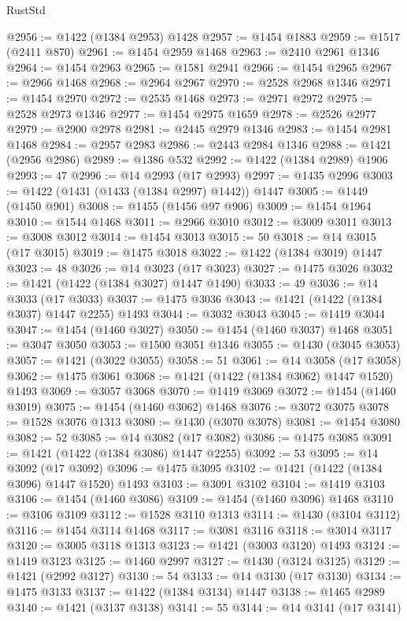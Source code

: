 \begin{lexlean}{RustStd}
\begin{coremodule}
@2956 := @1422 (@1384 @2953) @1428
@2957 := @1454 @1883
@2959 := @1517 (@2411 @870)
@2961 := @1454 @2959 @1468
@2963 := @2410 @2961 @1346
@2964 := @1454 @2963
@2965 := @1581 @2941
@2966 := @1454 @2965
@2967 := @2966 @1468
@2968 := @2964 @2967
@2970 := @2528 @2968 @1346
@2971 := @1454 @2970
@2972 := @2535 @1468
@2973 := @2971 @2972
@2975 := @2528 @2973 @1346
@2977 := @1454 @2975 @1659
@2978 := @2526 @2977
@2979 := @2900 @2978
@2981 := @2445 @2979 @1346
@2983 := @1454 @2981 @1468
@2984 := @2957 @2983
@2986 := @2443 @2984 @1346
@2988 := @1421 (@2956 @2986)
@2989 := @1386 @532
@2992 := @1422 (@1384 @2989) @1906
@2993 := 47
@2996 := @14 @2993 (@17 @2993)
@2997 := @1435 @2996
@3003 := @1422 (@1431 (@1433 (@1384 @2997) @1442)) @1447
@3005 := @1449 (@1450 @901)
@3008 := @1455 (@1456 @97 @906)
@3009 := @1454 @1964
@3010 := @1544 @1468
@3011 := @2966 @3010
@3012 := @3009 @3011
@3013 := @3008 @3012
@3014 := @1454 @3013
@3015 := 50
@3018 := @14 @3015 (@17 @3015)
@3019 := @1475 @3018
@3022 := @1422 (@1384 @3019) @1447
@3023 := 48
@3026 := @14 @3023 (@17 @3023)
@3027 := @1475 @3026
@3032 := @1421 (@1422 (@1384 @3027) @1447 @1490)
@3033 := 49
@3036 := @14 @3033 (@17 @3033)
@3037 := @1475 @3036
@3043 := @1421 (@1422 (@1384 @3037) @1447 @2255) @1493
@3044 := @3032 @3043
@3045 := @1419 @3044
@3047 := @1454 (@1460 @3027)
@3050 := @1454 (@1460 @3037) @1468
@3051 := @3047 @3050
@3053 := @1500 @3051 @1346
@3055 := @1430 (@3045 @3053)
@3057 := @1421 (@3022 @3055)
@3058 := 51
@3061 := @14 @3058 (@17 @3058)
@3062 := @1475 @3061
@3068 := @1421 (@1422 (@1384 @3062) @1447 @1520) @1493
@3069 := @3057 @3068
@3070 := @1419 @3069
@3072 := @1454 (@1460 @3019)
@3075 := @1454 (@1460 @3062) @1468
@3076 := @3072 @3075
@3078 := @1528 @3076 @1313
@3080 := @1430 (@3070 @3078)
@3081 := @1454 @3080
@3082 := 52
@3085 := @14 @3082 (@17 @3082)
@3086 := @1475 @3085
@3091 := @1421 (@1422 (@1384 @3086) @1447 @2255)
@3092 := 53
@3095 := @14 @3092 (@17 @3092)
@3096 := @1475 @3095
@3102 := @1421 (@1422 (@1384 @3096) @1447 @1520) @1493
@3103 := @3091 @3102
@3104 := @1419 @3103
@3106 := @1454 (@1460 @3086)
@3109 := @1454 (@1460 @3096) @1468
@3110 := @3106 @3109
@3112 := @1528 @3110 @1313
@3114 := @1430 (@3104 @3112)
@3116 := @1454 @3114 @1468
@3117 := @3081 @3116
@3118 := @3014 @3117
@3120 := @3005 @3118 @1313
@3123 := @1421 (@3003 @3120) @1493
@3124 := @1419 @3123
@3125 := @1460 @2997
@3127 := @1430 (@3124 @3125)
@3129 := @1421 (@2992 @3127)
@3130 := 54
@3133 := @14 @3130 (@17 @3130)
@3134 := @1475 @3133
@3137 := @1422 (@1384 @3134) @1447
@3138 := @1465 @2989
@3140 := @1421 (@3137 @3138)
@3141 := 55
@3144 := @14 @3141 (@17 @3141)

\end{coremodule}
\end{lexlean}
